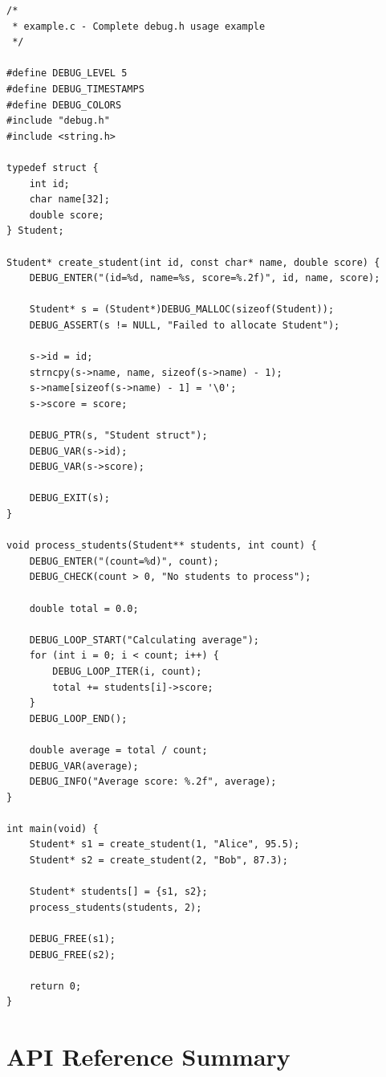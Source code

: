 \documentclass[11pt,a4paper]{article}
\begin{document}
\begin{lstlisting}
/*
 * example.c - Complete debug.h usage example
 */

#define DEBUG_LEVEL 5
#define DEBUG_TIMESTAMPS
#define DEBUG_COLORS
#include "debug.h"
#include <string.h>

typedef struct {
    int id;
    char name[32];
    double score;
} Student;

Student* create_student(int id, const char* name, double score) {
    DEBUG_ENTER("(id=%d, name=%s, score=%.2f)", id, name, score);
    
    Student* s = (Student*)DEBUG_MALLOC(sizeof(Student));
    DEBUG_ASSERT(s != NULL, "Failed to allocate Student");
    
    s->id = id;
    strncpy(s->name, name, sizeof(s->name) - 1);
    s->name[sizeof(s->name) - 1] = '\0';
    s->score = score;
    
    DEBUG_PTR(s, "Student struct");
    DEBUG_VAR(s->id);
    DEBUG_VAR(s->score);
    
    DEBUG_EXIT(s);
}

void process_students(Student** students, int count) {
    DEBUG_ENTER("(count=%d)", count);
    DEBUG_CHECK(count > 0, "No students to process");
    
    double total = 0.0;
    
    DEBUG_LOOP_START("Calculating average");
    for (int i = 0; i < count; i++) {
        DEBUG_LOOP_ITER(i, count);
        total += students[i]->score;
    }
    DEBUG_LOOP_END();
    
    double average = total / count;
    DEBUG_VAR(average);
    DEBUG_INFO("Average score: %.2f", average);
}

int main(void) {
    Student* s1 = create_student(1, "Alice", 95.5);
    Student* s2 = create_student(2, "Bob", 87.3);
    
    Student* students[] = {s1, s2};
    process_students(students, 2);
    
    DEBUG_FREE(s1);
    DEBUG_FREE(s2);
    
    return 0;
}
\end{lstlisting}

\section{API Reference Summary}
\end{document}
